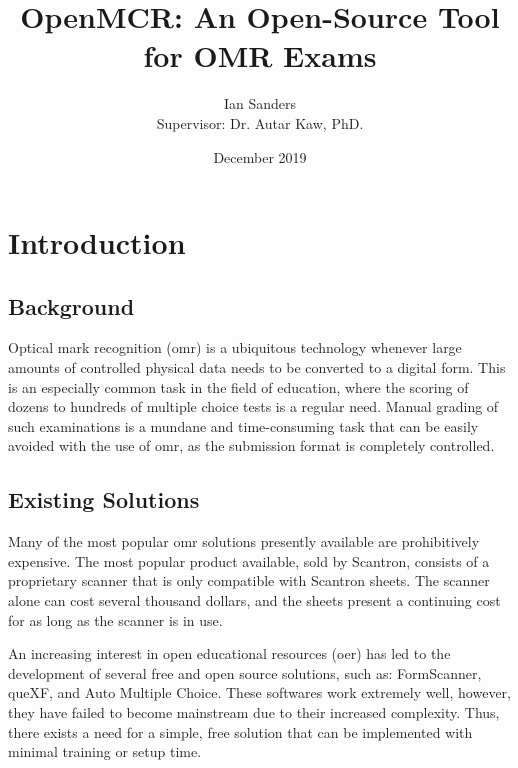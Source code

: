 \documentclass[12pt, letterpaper]{report}
\begin{document}
\hypersetup{linkcolor=usfgreen}
\frenchspacing



\renewcommand{\appendixname}{Appendix}

\title{OpenMCR: An Open-Source Tool for OMR Exams}
\author{Ian Sanders\\[1cm]{\small Supervisor: Dr. Autar Kaw, PhD.}}
\date{December 2019}
\maketitle

\tableofcontents
\listofcodesamples
\listoffigures
\listofeqns
\printacronyms[include-classes=abbrev,name=Abbreviations]

\chapter{Introduction}
\section{Background}
Optical mark recognition (\ac{omr}) is a ubiquitous technology whenever large amounts
of controlled physical data needs to be converted to a digital form. This is an
especially common task in the field of education, where the scoring of dozens to
hundreds of multiple choice tests is a regular need. Manual grading of such
examinations is a mundane and time-consuming task that can be easily avoided
with the use of \ac{omr}, as the submission format is completely controlled.
\section{Existing Solutions}
Many of the most popular \ac{omr} solutions presently available are prohibitively
expensive. The most popular product available, sold by Scantron, consists of a
proprietary scanner that is only compatible with Scantron sheets. The scanner
alone can cost several thousand dollars, and the sheets present a continuing
cost for as long as the scanner is in use.

An increasing interest in open educational resources (\ac{oer}) has led to the
development of several free and open source solutions, such as: FormScanner,
queXF, and Auto Multiple Choice. These softwares work extremely well, however,
they have failed to become mainstream due to their increased complexity. Thus,
there exists a need for a simple, free solution that can be implemented with
minimal training or setup time.
\end{document}
